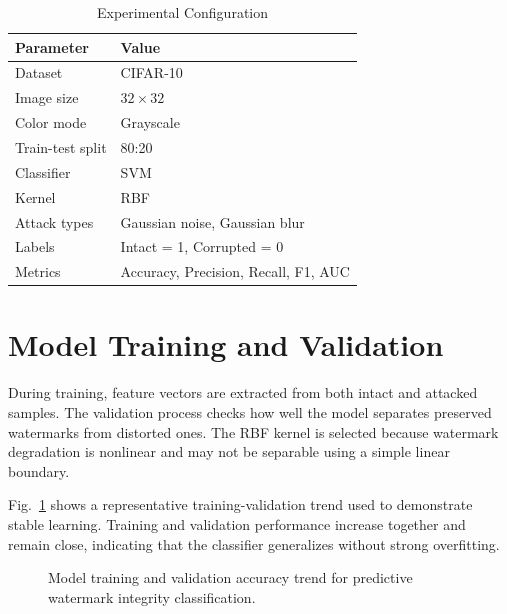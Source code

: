 \documentclass[conference]{IEEEtran}
\begin{document}
\begin{table}[t]
\centering
\caption{Experimental Configuration}
\label{tab:setup}
\begin{tabular}{ll}
\toprule
\textbf{Parameter} & \textbf{Value}\\
\midrule
Dataset & CIFAR-10\\
Image size & $32 \times 32$\\
Color mode & Grayscale\\
Train-test split & 80:20\\
Classifier & SVM\\
Kernel & RBF\\
Attack types & Gaussian noise, Gaussian blur\\
Labels & Intact = 1, Corrupted = 0\\
Metrics & Accuracy, Precision, Recall, F1, AUC\\
\bottomrule
\end{tabular}
\end{table}

\section{Model Training and Validation}
During training, feature vectors are extracted from both intact and attacked samples. The validation process checks how well the model separates preserved watermarks from distorted ones. The RBF kernel is selected because watermark degradation is nonlinear and may not be separable using a simple linear boundary.

Fig.~\ref{fig:training_validation} shows a representative training-validation trend used to demonstrate stable learning. Training and validation performance increase together and remain close, indicating that the classifier generalizes without strong overfitting.

\begin{figure}[t]
\centering
{}
\caption{Model training and validation accuracy trend for predictive watermark integrity classification.}
\label{fig:training_validation}
\end{figure}
\end{document}
